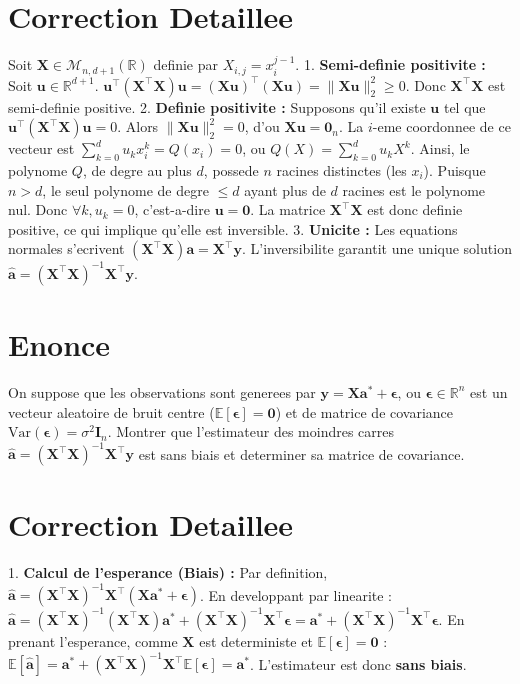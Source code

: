 \documentclass[11pt,a4paper]{report}
\begin{document}
\section{Correction Detaillee}
Soit $\mathbf{X} \in \mathcal{M}_{n, d+1}(\mathbb{R})$ definie par $X_{i,j} = x_i^{j-1}$.
1. \textbf{Semi-definie positivite :} Soit $\mathbf{u} \in \mathbb{R}^{d+1}$.
   $\mathbf{u}^\top(\mathbf{X}^\top\mathbf{X})\mathbf{u} = (\mathbf{X}\mathbf{u})^\top(\mathbf{X}\mathbf{u}) = \|\mathbf{X}\mathbf{u}\|_2^2 \ge 0$.
   Donc $\mathbf{X}^\top\mathbf{X}$ est semi-definie positive.
2. \textbf{Definie positivite :} Supposons qu'il existe $\mathbf{u}$ tel que $\mathbf{u}^\top(\mathbf{X}^\top\mathbf{X})\mathbf{u} = 0$.
   Alors $\|\mathbf{X}\mathbf{u}\|_2^2 = 0$, d'ou $\mathbf{X}\mathbf{u} = \mathbf{0}_n$.
   La $i$-eme coordonnee de ce vecteur est $\sum_{k=0}^d u_k x_i^k = Q(x_i) = 0$, ou $Q(X) = \sum_{k=0}^d u_k X^k$.
   Ainsi, le polynome $Q$, de degre au plus $d$, possede $n$ racines distinctes (les $x_i$).
   Puisque $n > d$, le seul polynome de degre $\le d$ ayant plus de $d$ racines est le polynome nul.
   Donc $\forall k, u_k = 0$, c'est-a-dire $\mathbf{u} = \mathbf{0}$.
   La matrice $\mathbf{X}^\top\mathbf{X}$ est donc definie positive, ce qui implique qu'elle est inversible.
3. \textbf{Unicite :} Les equations normales s'ecrivent $(\mathbf{X}^\top\mathbf{X})\mathbf{a} = \mathbf{X}^\top\mathbf{y}$. L'inversibilite garantit une unique solution $\hat{\mathbf{a}} = (\mathbf{X}^\top\mathbf{X})^{-1}\mathbf{X}^\top\mathbf{y}$.

\section{Enonce}
On suppose que les observations sont generees par $\mathbf{y} = \mathbf{X}\mathbf{a}^* + \boldsymbol{\epsilon}$, ou $\boldsymbol{\epsilon} \in \mathbb{R}^n$ est un vecteur aleatoire de bruit centre ($\mathbb{E}[\boldsymbol{\epsilon}] = \mathbf{0}$) et de matrice de covariance $\text{Var}(\boldsymbol{\epsilon}) = \sigma^2 \mathbf{I}_n$.
Montrer que l'estimateur des moindres carres $\hat{\mathbf{a}} = (\mathbf{X}^\top\mathbf{X})^{-1}\mathbf{X}^\top\mathbf{y}$ est sans biais et determiner sa matrice de covariance.

\section{Correction Detaillee}
1. \textbf{Calcul de l'esperance (Biais) :}
   Par definition, $\hat{\mathbf{a}} = (\mathbf{X}^\top\mathbf{X})^{-1}\mathbf{X}^\top(\mathbf{X}\mathbf{a}^* + \boldsymbol{\epsilon})$.
   En developpant par linearite :
   $\hat{\mathbf{a}} = (\mathbf{X}^\top\mathbf{X})^{-1}(\mathbf{X}^\top\mathbf{X})\mathbf{a}^* + (\mathbf{X}^\top\mathbf{X})^{-1}\mathbf{X}^\top\boldsymbol{\epsilon} = \mathbf{a}^* + (\mathbf{X}^\top\mathbf{X})^{-1}\mathbf{X}^\top\boldsymbol{\epsilon}$.
   En prenant l'esperance, comme $\mathbf{X}$ est deterministe et $\mathbb{E}[\boldsymbol{\epsilon}] = \mathbf{0}$ :
   $\mathbb{E}[\hat{\mathbf{a}}] = \mathbf{a}^* + (\mathbf{X}^\top\mathbf{X})^{-1}\mathbf{X}^\top\mathbb{E}[\boldsymbol{\epsilon}] = \mathbf{a}^*$.
   L'estimateur est donc \textbf{sans biais}.
\end{document}
